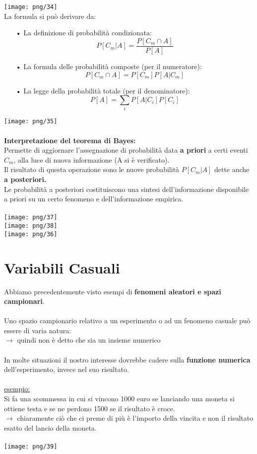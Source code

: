 \documentclass[12pt, letterpaper]{article}
\begin{document}
\texttt{[image: png/34]}
\\
La formula si può derivare da:
\begin{itemize}
   \item[•] La definizione di probabilità condizionata:
      \[P[C_m|A] = \frac{P[C_m\cap A]}{P[A]}\]
   \item[•] La formula delle probabilità composte (per il numeratore):
      \[P[C_m \cap A] = P[C_m]P[A|C_m]\]
   \item[•] La legge della probabilità totale (per il denominatore):
      \[P[A] = \sum_i P[A|C_i]P[C_i]\]
\end{itemize}
\texttt{[image: png/35]}
\\
\\
\textbf{Interpretazione del teorema di Bayes:}\\
Permette di aggiornare l'assegnazione di probabilità data \textbf{a priori} a certi 
eventi $C_m$, alla luce di nuova informazione (A si è verificato).
\\
Il risultato di questa operazione sono le nuove probabilità $P[C_m|A]$ dette anche 
\textbf{a posteriori.}
\\
Le probabilità a posteriori costituiscono una sintesi dell'informazione disponibile a priori su un certo fenomeno e dell'informazione empirica.
\\
\\
\texttt{[image: png/37]}\\
\texttt{[image: png/38]}\\
\texttt{[image: png/36]}\\

\newpage

\section{Variabili Casuali}

Abbiamo precedentemente visto esempi di \textbf{fenomeni aleatori e spazi campionari}.
\\\\
Uno spazio campionario relativo a un esperimento o ad un fenomeno casuale può essere di varia natura: \\
$\rightarrow$ quindi non è detto che sia un insieme numerico
\\
\\
In molte situazioni il nostro interesse dovrebbe cadere sulla \textbf{funzione numerica} dell'esperimento, invece nel suo risultato.
\\
\\
\underline{esempio:}
\\
Si fa una scommessa in cui si vincono 1000 euro se lanciando una moneta si ottiene testa e se ne perdono 1500 se il risultato è croce.
\\
$\rightarrow$ chiaramente ciò che ci preme di più è l'importo della vincita e non il risultato esatto del lancio della moneta.
\\\\
\texttt{[image: png/39]}
\end{document}

